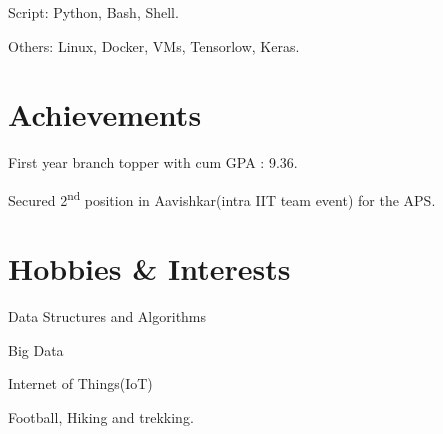 \documentclass[]{deedy-resume-openfont}
\begin{document}
\large{{Script}}: Python, Bash, Shell. 

\large{{Others}}: Linux, Docker, VMs, Tensorlow, Keras. 
\sectionsep

\section{Achievements}
\begin{tightemize}
\vspace{\topsep}
\item First year branch topper with cum GPA : 9.36.
\item Secured 2\textsuperscript{nd} position in Aavishkar(intra IIT team event) for the APS.
\end{tightemize}

\section{Hobbies \& Interests}
\vspace{\topsep}
\begin{tightemize}
\item Data Structures and Algorithms
\item Big Data
\item Internet of Things(IoT)
\item Football, Hiking and trekking.
\end{tightemize}

\hfill
\end{document}
